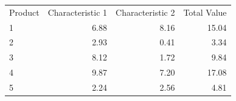 \begin{tabular}{lrrr}
Product & Characteristic 1 & Characteristic 2 & Total Value \\
1 & 6.88 & 8.16 & 15.04 \\
2 & 2.93 & 0.41 & 3.34 \\
3 & 8.12 & 1.72 & 9.84 \\
4 & 9.87 & 7.20 & 17.08 \\
5 & 2.24 & 2.56 & 4.81 \\
\end{tabular}